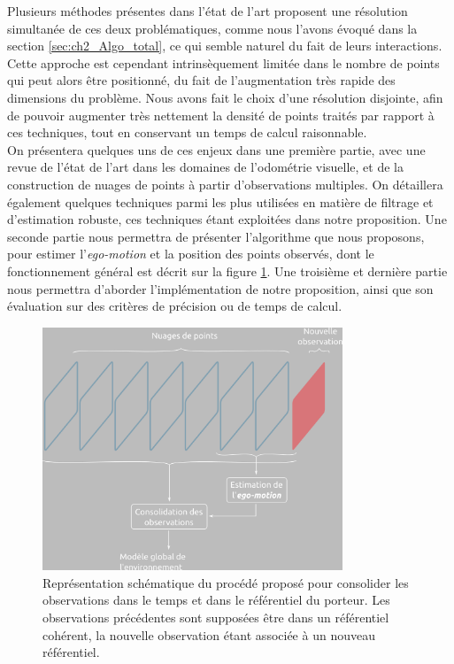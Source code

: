 Plusieurs méthodes présentes dans l'état de l'art proposent une résolution simultanée de ces deux problématiques, comme nous l'avons évoqué dans la section \ref{sec:ch2_Algo_total}, ce qui semble naturel du fait de leurs interactions. Cette approche est cependant intrinsèquement limitée dans le nombre de points qui peut alors être positionné, du fait de l'augmentation très rapide des dimensions du problème. Nous avons fait le choix d'une résolution disjointe, afin de pouvoir augmenter très nettement la densité de points traités par rapport à ces techniques, tout en conservant un temps de calcul raisonnable.\\
On présentera quelques uns de ces enjeux dans une première partie, avec une revue de l'état de l'art dans les domaines de l'odométrie visuelle, et de la construction de nuages de points à partir d'observations multiples. On détaillera également quelques techniques parmi les plus utilisées en matière de filtrage et d'estimation robuste, ces techniques étant exploitées dans notre proposition. Une seconde partie nous permettra de présenter l'algorithme que nous proposons, pour estimer l'\emph{ego-motion} et la position des points observés, dont le fonctionnement général est décrit sur la figure \ref{fig:ch4_schéma_global}. Une troisième et dernière partie nous permettra d'aborder l'implémentation de notre proposition, ainsi que son évaluation sur des critères de précision ou de temps de calcul.

\begin{figure}
	\centering
	\includegraphics[width=0.8\textwidth]{Chapter4/graphics/overall_scheme.png}
	\caption{Représentation schématique du procédé proposé pour consolider les observations dans le temps et dans le référentiel du porteur. Les observations précédentes sont supposées  être dans un référentiel cohérent, la nouvelle observation étant associée à un nouveau référentiel.}
	\label{fig:ch4_schéma_global}
\end{figure}

